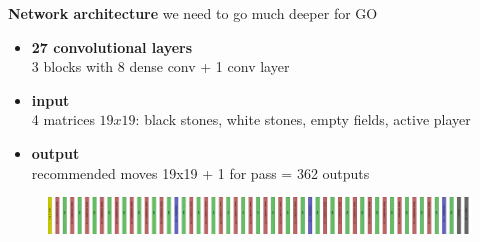 \documentclass[xcolor=dvipsnames]{beamer}
\begin{document}
\begin{frame}{\bf Network architecture}
we need to go much deeper for GO
\begin{itemize}
  \item {\bf 27 convolutional layers} \\ 3 blocks with 8 dense conv + 1 conv layer
  \item {\bf input} \\ 4 matrices $19x19$: black stones, white stones, empty fields, active player
  \item {\bf output} \\ recommended moves 19x19 + 1 for pass = 362 outputs

\end{itemize}

  \begin{figure}[!htb]
    \centering
    \includegraphics[scale=0.07]{../../pictures/go_cnn.png}
  \end{figure}

\end{frame}
\end{document}
